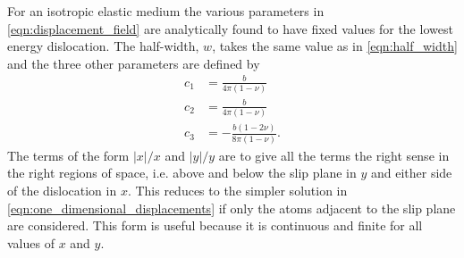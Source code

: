 For an isotropic elastic medium the various parameters in \ref{eqn:displacement_field} are analytically found to have fixed values for the lowest energy dislocation. The half-width, $w$, takes the same value as in \autoref{eqn:half_width} and the three other parameters are defined by
\begin{subequations}\label{eqn:disloc_params}
\begin{align}
c_1 &= \frac{b}{4\pi{}(1-\nu)} \\
c_2 &= \frac{b}{4\pi{}(1-\nu)} \\
c_3 &= - \frac{b(1-2\nu)}{8\pi(1-\nu)}.
\end{align}
\label{eqn:expressions_for_the_ideal_disloca_parameters}
\end{subequations}
The terms of the form $|x|/x$ and $|y|/y$ are to give all the terms the right sense in the right regions of space, i.e. above and below the slip plane in $y$ and either side of the dislocation in $x$. This reduces to the simpler solution in \autoref{eqn:one_dimensional_displacements} if only the atoms adjacent to the slip plane are considered. This form is useful because it is continuous and finite for all values of $x$ and $y$. 


